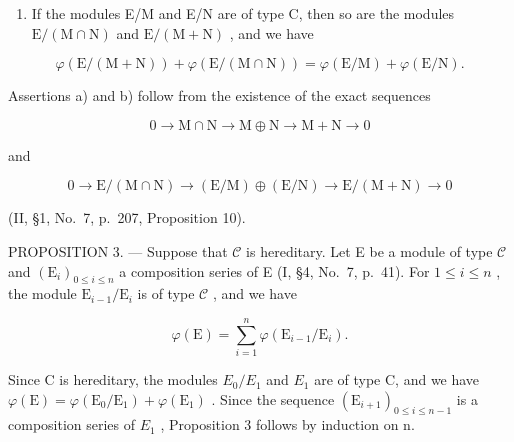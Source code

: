 \begin{enumerate}
\def\labelenumi{\alph{enumi})}
\setcounter{enumi}{1}
\tightlist
\item
  If the modules E/M and E/N are of type C, then so are the modules \(\mathrm{E}/(\mathrm{M}\cap\mathrm{N})\) and \(\mathrm{E}/(\mathrm{M}+\mathrm{N})\) , and we have
\end{enumerate}

\[
\varphi (\mathrm{E} / (\mathrm{M} + \mathrm{N})) + \varphi (\mathrm{E} / (\mathrm{M} \cap \mathrm{N})) = \varphi (\mathrm{E} / \mathrm{M}) + \varphi (\mathrm{E} / \mathrm{N}).
\]

Assertions a) and b) follow from the existence of the exact sequences

\[
0 \to \mathrm{M} \cap \mathrm{N} \to \mathrm{M} \oplus \mathrm{N} \to \mathrm{M} + \mathrm{N} \to 0
\]

and

\[
0 \to \mathrm{E} / (\mathrm{M} \cap \mathrm{N}) \to (\mathrm{E} / \mathrm{M}) \oplus (\mathrm{E} / \mathrm{N}) \to \mathrm{E} / (\mathrm{M} + \mathrm{N}) \to 0
\]

(II, §1, No.~7, p.~207, Proposition 10).

PROPOSITION 3. --- Suppose that \(\mathcal{C}\) is hereditary. Let E be a module of type \(\mathcal{C}\) and \((\mathrm{E}_i)_{0\leqslant i\leqslant n}\) a composition series of E (I, §4, No.~7, p.~41). For \(1\leqslant i\leqslant n\) , the module \(\mathrm{E}_{i - 1} / \mathrm{E}_i\) is of type \(\mathcal{C}\) , and we have

\[
\varphi (\mathrm{E}) = \sum_ {i = 1} ^ {n} \varphi (\mathrm{E} _ {i - 1} / \mathrm{E} _ {i}).
\]

Since C is hereditary, the modules \(E_{0}/E_{1}\) and \(E_{1}\) are of type C, and we have \(\varphi(\mathrm{E}) = \varphi(\mathrm{E}_{0}/\mathrm{E}_{1}) + \varphi(\mathrm{E}_{1})\) . Since the sequence \((\mathrm{E}_{i+1})_{0 \leqslant i \leqslant n-1}\) is a composition series of \(E_{1}\) , Proposition 3 follows by induction on n.

